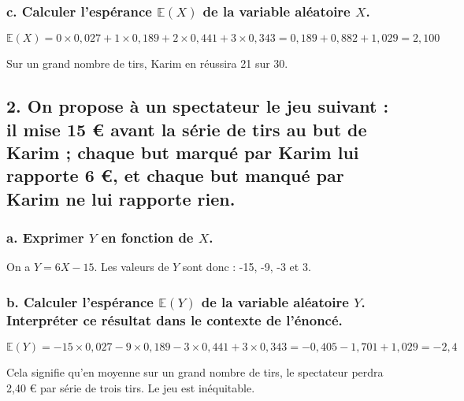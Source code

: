 	\subsubsection*{c. Calculer l'espérance $\mathbb{E}(X)$ de la variable aléatoire $X$.}
	
	\[
	\mathbb{E}(X) = 0 \times 0,027 + 1 \times 0,189 + 2 \times 0,441 + 3 \times 0,343 = 0,189 + 0,882 + 1,029 = 2,100
	\]
	
	Sur un grand nombre de tirs, Karim en réussira 21 sur 30.
	
	\subsection*{2. On propose à un spectateur le jeu suivant : il mise 15 € avant la série de tirs au but de Karim ; chaque but marqué par Karim lui rapporte 6 €, et chaque but manqué par Karim ne lui rapporte rien.}
	
	\subsubsection*{a. Exprimer $Y$ en fonction de $X$.}
	
	On a $Y = 6X - 15$. Les valeurs de $Y$ sont donc : -15, -9, -3 et 3.
	
	\subsubsection*{b. Calculer l'espérance $\mathbb{E}(Y)$ de la variable aléatoire $Y$. Interpréter ce résultat dans le contexte de l'énoncé.}
	
	\[
	\mathbb{E}(Y) = -15 \times 0,027 - 9 \times 0,189 - 3 \times 0,441 + 3 \times 0,343 = -0,405 - 1,701 + 1,029 = -2,4
	\]
	
	Cela signifie qu'en moyenne sur un grand nombre de tirs, le spectateur perdra 2,40 € par série de trois tirs. Le jeu est inéquitable.
